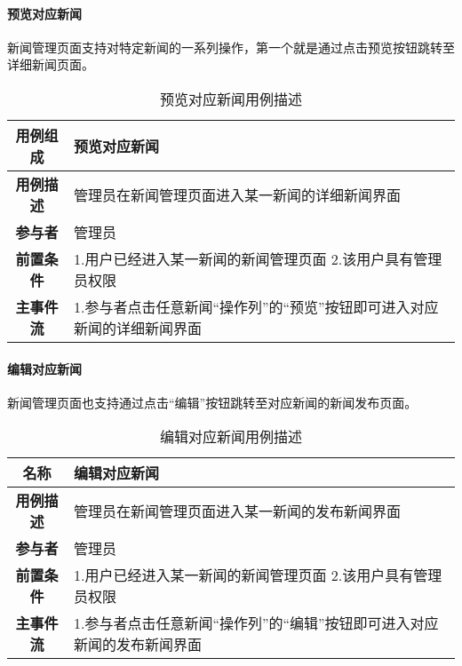 \paragraph{预览对应新闻}

新闻管理页面支持对特定新闻的一系列操作，第一个就是通过点击预览按钮跳转至详细新闻页面。\\

\begin{table}[H]
	\centering
	\caption{预览对应新闻用例描述}
	\renewcommand\arraystretch{1.5}
	\begin{tabular}{|c|>{\raggedright\arraybackslash}p{10cm}|}
		\hline
		\textbf{用例组成} & \textbf{预览对应新闻}\\
		\hline
		\textbf{用例描述} & 管理员在新闻管理页面进入某一新闻的详细新闻界面\\ 
		\hline
		\textbf{参与者} & 管理员\\
		\hline
		\textbf{前置条件} & 
		1.用户已经进入某一新闻的新闻管理页面\newline
		2.该用户具有管理员权限\\
		\hline
		\textbf{主事件流} & 
		1.参与者点击任意新闻“操作列”的“预览”按钮即可进入对应新闻的详细新闻界面\\
		\hline
	\end{tabular}
\end{table}

\paragraph{编辑对应新闻}

新闻管理页面也支持通过点击“编辑”按钮跳转至对应新闻的新闻发布页面。\\

\begin{table}[H]
	\centering
	\caption{编辑对应新闻用例描述}
	\renewcommand\arraystretch{1.5}
	\begin{tabular}{|c|>{\raggedright\arraybackslash}p{10cm}|}
		\hline
		\textbf{名称} & \textbf{编辑对应新闻}\\
		\hline
		\textbf{用例描述} & 管理员在新闻管理页面进入某一新闻的发布新闻界面\\ 
		\hline
		\textbf{参与者} & 管理员\\
		\hline
		\textbf{前置条件} & 
		1.用户已经进入某一新闻的新闻管理页面\newline
		2.该用户具有管理员权限\\
		\hline
		\textbf{主事件流} & 
		1.参与者点击任意新闻“操作列”的“编辑”按钮即可进入对应新闻的发布新闻界面\\
		\hline
	\end{tabular}
\end{table}

